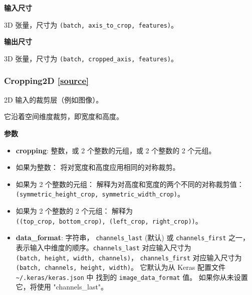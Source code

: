 \textbf{输入尺寸}

3D 张量，尺寸为 \texttt{(batch,\ axis\_to\_crop,\ features)}。

\textbf{输出尺寸}

3D 张量，尺寸为 \texttt{(batch,\ cropped\_axis,\ features)}。




\subsubsection{Cropping2D {\href{https://github.com/keras-team/keras/blob/master/keras/layers/convolutional.py\#L2007}{{[}source{]}}}}

\begin{Shaded}
\begin{Highlighting}[]
\OperatorTok{=}\NormalTok{((}\NormalTok{, }\NormalTok{), (}\NormalTok{, }\OperatorTok{=}\NormalTok{)}
\end{Highlighting}
\end{Shaded}

2D 输入的裁剪层（例如图像）。

它沿着空间维度裁剪，即宽度和高度。

\textbf{参数}

\begin{itemize}
\tightlist
\item
  \textbf{cropping}: 整数，或 2 个整数的元组，或 2 个整数的 2 个元组。
\item
  如果为整数： 将对宽度和高度应用相同的对称裁剪。
\item
  如果为 2 个整数的元组： 解释为对高度和宽度的两个不同的对称裁剪值：
  \texttt{(symmetric\_height\_crop,\ symmetric\_width\_crop)}。
\item
  如果为 2 个整数的 2 个元组： 解释为
  \texttt{((top\_crop,\ bottom\_crop),\ (left\_crop,\ right\_crop))}。
\item
  \textbf{data\_format}: 字符串， \texttt{channels\_last} (默认) 或
  \texttt{channels\_first} 之一，
  表示输入中维度的顺序。\texttt{channels\_last} 对应输入尺寸为
  \texttt{(batch,\ height,\ width,\ channels)}，
  \texttt{channels\_first} 对应输入尺寸为
  \texttt{(batch,\ channels,\ height,\ width)}。 它默认为从 Keras
  配置文件 \texttt{\textasciitilde{}/.keras/keras.json} 中 找到的
  \texttt{image\_data\_format} 值。 如果你从未设置它，将使用
  "channels\_last"。
\end{itemize}

